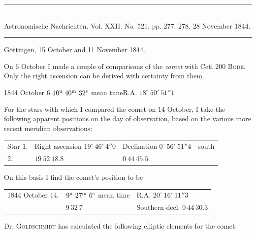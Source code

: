 \clearpage
{}
\hypertarget{native-474-lower}{}
\begin{center}
\rule{0.55\linewidth}{0.4pt}\\[2pt]
Astronomische Nachrichten. Vol. XXII. No. 521. pp. 277. 278. 28 November 1844.\\[2pt]
\rule{0.55\linewidth}{0.4pt}
\end{center}
\begin{flushright}Göttingen, 15 October and 11 November 1844.\end{flushright}

On 6 October I made a couple of comparisons of the \emph{comet} with Ceti 200 \textsc{Bode}. Only the right ascension can be derived with certainty from them.

\begin{center}
1844 October 6.\quad $10^{\rm u}\ 40^{\rm m}\ 32^{\rm s}$ mean time\quad R.A. $18^\circ\ 50'\ 51''1$
\end{center}

For the stars with which I compared the comet on 14 October, I take the following apparent positions on the day of observation, based on the various more recent meridian observations:

\begin{center}
\setlength{\tabcolsep}{3pt}
\begin{tabular}{llll}
Star 1. & \shortstack[l]{Right ascension\\$19^\circ\ 46'\ 4''0$} & \shortstack[l]{Declination\\$0^\circ\ 56'\ 51''4$} & south \\
\hfill 2. & \hfill $19\ 52\ 18.8$ & \hfill $0\ 44\ 45.5$ & \\
\end{tabular}
\end{center}
\noindent On this basis I find the comet’s position to be

\begin{center}
\setlength{\tabcolsep}{3pt}
\begin{tabular}{lll}
1844 October 14. & $9^{\rm u}\ 27^{\rm m}\ 6^{\rm s}$ mean time & R.A. $20^\circ\ 16'\ 11''3$ \\
 & $9\ 32\ 7$ & Southern decl. $0\ 44\ 30.3$ \\
\end{tabular}
\end{center}

Dr. \textsc{Goldschmidt} has calculated the following elliptic elements for the comet:

